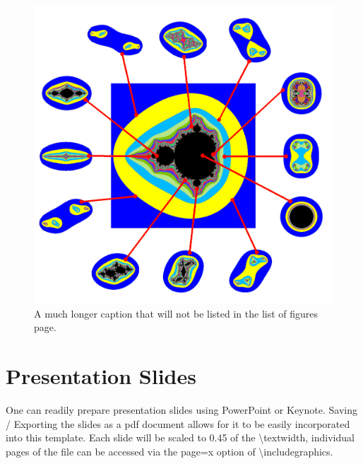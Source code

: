 \begin{figure}
\centerline{\includegraphics[width=7in]{appendix/images/samplepng}}
\caption[A Sideways Figure]{
	A much longer caption that will not be listed in the list of figures page.
}
\label{fig:sidewaysFigure}
\end{figure}

\chapter{Presentation Slides}
One can readily prepare presentation slides using PowerPoint or Keynote. Saving / Exporting the slides as a pdf document allows for it to be easily incorporated into this template. Each slide will be scaled to 0.45 of the \textbackslash textwidth, individual pages of the file can be accessed via the page=x option of \textbackslash includegraphics.  


